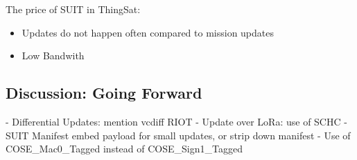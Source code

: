 \begin{figure}
    
\end{figure}

\begin{table}
    
\end{table}

\begin{figure}
    
\end{figure}


The price of SUIT in ThingSat:

\begin{itemize}
    \item Updates do not happen often compared to mission updates
    \item Low Bandwith
\end{itemize}

\subsection{Discussion: Going Forward}
- Differential Updates: mention vcdiff RIOT
- Update over LoRa: use of SCHC
- SUIT Manifest embed payload for small updates, or strip down manifest
- Use of COSE\_Mac0\_Tagged instead of COSE\_Sign1\_Tagged
